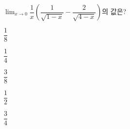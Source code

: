 $\displaystyle\lim_{x\to 0} \dfrac{1}{x}\left(\dfrac{1}{\sqrt{1-x}}-\dfrac{2}{\sqrt{4-x}}\right)$의 값은?
\begin{choices32}{\rule[-3ex]{0pt}{8ex}$\dfrac{1}{8}$}{\rule[-3ex]{0pt}{8ex}$\dfrac{1}{4}$}{\rule[-3ex]{0pt}{8ex}$\dfrac{3}{8}$}{\rule[-3ex]{0pt}{8ex}$\dfrac{1}{2}$}{\rule[-3ex]{0pt}{8ex}$\dfrac{3}{4}$}\end{choices32}
